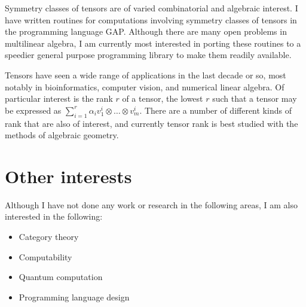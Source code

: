 \documentclass[11pt]{article}
\begin{document}
Symmetry classes of tensors are of varied combinatorial and algebraic
interest. I have written routines for computations involving symmetry classes of
tensors in the programming language GAP. Although there are many open problems
in multilinear algebra, I am currently most interested in porting these routines
to a speedier general purpose programming library to make them readily
available.

Tensors have seen a wide range of applications in the last decade or so, most
notably in bioinformatics, computer vision, and numerical linear algebra. Of
particular interest is the rank $r$ of a tensor, the lowest $r$ such that a
tensor may be expressed as \( \sum_{i=1}^r\alpha_i v_1^i \otimes \dots \otimes
v_m^i \). There are a number of different kinds of rank that are also of
interest, and currently tensor rank is best studied with the methods of
algebraic geometry.

\section{Other interests}

Although I have not done any work or research in the following areas, I am also
interested in the following:

\begin{itemize}
\item Category theory
\item Computability
\item Quantum computation
\item Programming language design
\end{itemize}

\printbibliography
\end{document}
